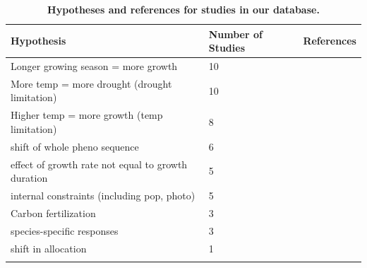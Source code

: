 \documentclass[11pt]{article}
\begin{document}
\newpage
\begingroup\footnotesize
\begin{longtable}{p{}p{}p{}}
\caption{\textbf{Hypotheses and references for studies in our database.}} \\ 
  \hline
Hypothesis & Number of Studies & References \\ 
  \hline \endhead  \hline
Longer growing season = more growth &  10 & \citep{camarero2022decoupled,chen2000,vcufar2015variations,delpierre2017tree,de2022temperature,gao2022earlier,grossiord2022warming,keenan2014net,silvestro2023longer,wheeler2016snow} \\ 
  More temp = more drought (drought limitation) &  10 & \citep{brand2022,buermann2018widespread,camarero2022decoupled,de2022temperature,drew2018growth,eckes2021,etzold2022number,kolavr2016response,oddi2022contrasting,zhu2021afm} \\ 
  Higher temp = more growth (temp limitation) &   8 & \citep{camarero2022decoupled,dow2022warm,finzi2020,moser2010timing,richardson2010influence,soolanayakanahally2013timing,stridbeck2022,zhang2021drought} \\ 
  shift of whole pheno sequence &   6 & \citep{delpierre2017tree,de2022temperature,richardson2010influence,soolanayakanahally2013timing,zani2020increased,zohner2020interactive} \\ 
  effect of growth rate not equal to growth duration &   5 & \citep{cuny2012life,de2022temperature,francon2020,michelot2012comparing,ren2019} \\ 
  internal constraints (including pop, photo) &   5 & \citep{moser2010timing,sebazc2020,soolanayakanahally2013timing,vitasse2009altitudinal,zohner2023effect} \\ 
  Carbon fertilization &   3 & \citep{chen1999effects,finzi2020,oddi2022contrasting} \\ 
  species-specific responses &   3 & \citep{cuny2012life,etzold2022number,michelot2012comparing} \\ 
  shift in allocation &   1 & \citep{mckown2016impacts} \\ 
  \hline
\label{tab:ref}
\end{longtable}
\endgroup
\end{document}
